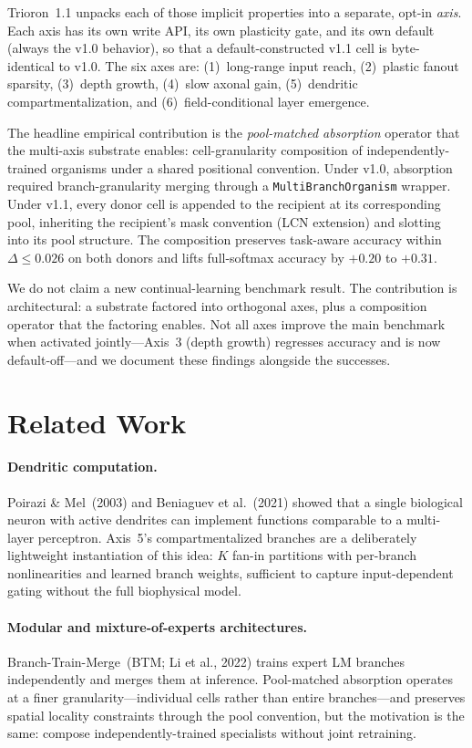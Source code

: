 \documentclass[11pt]{article}
\begin{document}
Trioron~1.1 unpacks each of those implicit properties into a separate,
opt-in \emph{axis}.
Each axis has its own write API, its own plasticity gate, and its own
default (always the v1.0 behavior), so that a default-constructed v1.1
cell is byte-identical to v1.0.
The six axes are: (1)~long-range input reach, (2)~plastic fanout
sparsity, (3)~depth growth, (4)~slow axonal gain, (5)~dendritic
compartmentalization, and (6)~field-conditional layer emergence.

The headline empirical contribution is the \emph{pool-matched
absorption} operator that the multi-axis substrate enables:
cell-granularity composition of independently-trained organisms under a
shared positional convention.
Under v1.0, absorption required branch-granularity merging through a
\texttt{MultiBranchOrganism} wrapper.
Under v1.1, every donor cell is appended to the recipient at its
corresponding pool, inheriting the recipient's mask convention (LCN
extension) and slotting into its pool structure.
The composition preserves task-aware accuracy within $\Delta \leq 0.026$
on both donors and lifts full-softmax accuracy by $+0.20$ to $+0.31$.

We do not claim a new continual-learning benchmark result.
The contribution is architectural: a substrate factored into orthogonal
axes, plus a composition operator that the factoring enables.
Not all axes improve the main benchmark when activated jointly---Axis~3
(depth growth) regresses accuracy and is now default-off---and we
document these findings alongside the successes.


\section{Related Work}
\label{sec:related}

\paragraph{Dendritic computation.}
Poirazi \& Mel~(2003) and Beniaguev et al.~(2021) showed that a single
biological neuron with active dendrites can implement functions
comparable to a multi-layer perceptron.
Axis~5's compartmentalized branches are a deliberately lightweight
instantiation of this idea: $K$ fan-in partitions with per-branch
nonlinearities and learned branch weights, sufficient to capture
input-dependent gating without the full biophysical model.

\paragraph{Modular and mixture-of-experts architectures.}
Branch-Train-Merge~(BTM; Li et al., 2022) trains expert LM branches
independently and merges them at inference.
Pool-matched absorption operates at a finer granularity---individual
cells rather than entire branches---and preserves spatial locality
constraints through the pool convention, but the motivation is the same:
compose independently-trained specialists without joint retraining.
\end{document}
